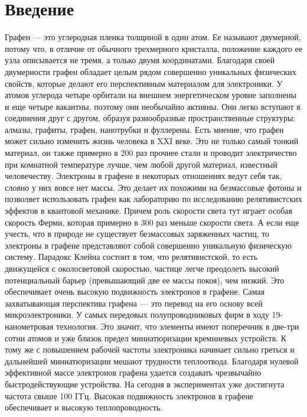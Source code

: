 \documentclass[a4paper,12pt]{article} %
\begin{document}
\section{Введение}
\noindent Графен — это углеродная пленка толщиной в один атом. Ее называют двумерной, потому что, в отличие от обычного трехмерного кристалла, положение каждого ее узла описывается не тремя, а только двумя координатами. Благодаря своей двумерности графен обладает целым рядом совершенно уникальных физических свойств, которые делают его перспективным материалом для электроники.
\medskip
\noindent У атомов углерода четыре орбитали на внешнем энергетическом уровне заполнены и еще четыре вакантны, поэтому они необычайно активны. Они легко вступают в соединения друг с другом, образуя разнообразные пространственные структуры: алмазы, графиты, графен, нанотрубки и фуллерены.
\medskip
\noindent Есть мнение, что графен может сильно изменить жизнь человека в XXI веке. Это не только самый тонкий материал, он также примерно в 200 раз прочнее стали и проводит электричество при комнатной температуре лучше, чем любой другой материал, известный человечеству.
\medskip
\noindent Электроны в графене в некоторых отношениях ведут себя так, словно у них вовсе нет массы. Это делает их похожими на безмассовые фотоны и позволяет использовать графен как лабораторию по исследованию релятивистских эффектов в квантовой механике. Причем роль скорости света тут играет особая скорость Ферми, которая примерно в 300 раз меньше скорости света. А если еще учесть, что в природе не существует безмассовых заряженных частиц, то электроны в графене представляют собой совершенно уникальную физическую систему.
\medskip
\noindent Парадокс Клейна состоит в том, что релятивистской, то есть движущейся с околосветовой скоростью, частице легче преодолеть высокий потенциальный барьер (превышающий две ее массы покоя), чем низкий. Это обеспечивает очень высокую подвижность электронов в графене.
\medskip
\noindent Самая захватывающая перспектива графена — это перевод на его основу всей микроэлектроники. У самых передовых полупроводниковых фирм в ходу 19-нанометровая технология. Это значит, что элементы имеют поперечник в две-три сотни атомов и уже близок предел миниатюризации кремниевых устройств. К тому же с повышением рабочей частоты электроника начинает сильно греться и дальнейшей миниатюризации мешают трудности теплоотвода. Благодаря нулевой эффективной массе электронов графена удается создавать чрезвычайно быстродействующие устройства. На сегодня в экспериментах уже достигнута частота свыше 100 ГГц. Высокая подвижность электронов в графене обеспечивает и высокую теплопроводность. 
\end{document}
